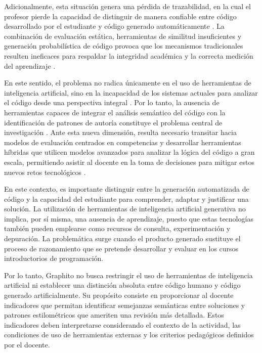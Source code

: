 Adicionalmente, esta situación genera una pérdida de trazabilidad, en la cual el profesor pierde la capacidad de distinguir de manera confiable entre código desarrollado por el estudiante y código generado automáticamente \cite{bazaluk2023challenges}. La combinación de evaluación estática, herramientas de similitud insuficientes y generación probabilística de código provoca que los mecanismos tradicionales resulten ineficaces para respaldar la integridad académica y la correcta medición del aprendizaje \cite{bazaluk2023challenges}.

En este sentido, el problema no radica únicamente en el uso de herramientas de inteligencia artificial, sino en la incapacidad de los sistemas actuales para analizar el código desde una perspectiva integral \cite{bazaluk2023challenges}. Por lo tanto, la ausencia de herramientas capaces de integrar el análisis semántico del código con la identificación de patrones de autoría constituye el problema central de investigación \cite{mekterovic2023automated}. Ante esta nueva dimensión, resulta necesario transitar hacia modelos de evaluación centrados en competencias y desarrollar herramientas híbridas que utilicen modelos avanzados para analizar la lógica del código a gran escala, permitiendo asistir al docente en la toma de decisiones para mitigar estos nuevos retos tecnológicos \cite{mekterovic2023automated}.

En este contexto, es importante distinguir entre la generación automatizada de código y la capacidad del estudiante para comprender, adaptar y justificar una solución. La utilización de herramientas de inteligencia artificial generativa no implica, por sí misma, una ausencia de aprendizaje, puesto que estas tecnologías también pueden emplearse como recursos de consulta, experimentación y depuración. La problemática surge cuando el producto generado sustituye el proceso de razonamiento que se pretende desarrollar y evaluar en los cursos introductorios de programación.

Por lo tanto, Graphito no busca restringir el uso de herramientas de inteligencia artificial ni establecer una distinción absoluta entre código humano y código generado artificialmente. Su propósito consiste en proporcionar al docente indicadores que permitan identificar semejanzas semánticas entre soluciones y patrones estilométricos que ameriten una revisión más detallada. Estos indicadores deben interpretarse considerando el contexto de la actividad, las condiciones de uso de herramientas externas y los criterios pedagógicos definidos por el docente.

